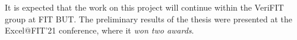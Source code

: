 \vspace{-.2em}

It is expected that the work on this project will continue within the VeriFIT group at FIT BUT. The preliminary results of the thesis were presented at the Excel@FIT'21 conference, where it \emph{won two awards}.



